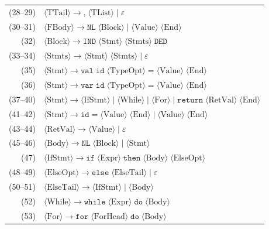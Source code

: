 \documentclass[11pt, a4paper]{article}
\begin{document}
\begin{tabular}{@{}r l@{}}
  (28--29)& $\langle\text{TTail}\rangle \to \texttt{,}\;\langle\text{TList}\rangle \mid \varepsilon$ \\
  (30--31)& $\langle\text{FBody}\rangle \to \texttt{NL}\;\langle\text{Block}\rangle \mid \langle\text{Value}\rangle\;\langle\text{End}\rangle$ \\
  (32)    & $\langle\text{Block}\rangle \to \texttt{IND}\;\langle\text{Stmt}\rangle\;\langle\text{Stmts}\rangle\;\texttt{DED}$ \\
  (33--34)& $\langle\text{Stmts}\rangle \to \langle\text{Stmt}\rangle\;\langle\text{Stmts}\rangle \mid \varepsilon$ \\
  (35)    & $\langle\text{Stmt}\rangle \to \texttt{val}\;\texttt{id}\;\langle\text{TypeOpt}\rangle\;\texttt{=}\;\langle\text{Value}\rangle\;\langle\text{End}\rangle$ \\
  (36)    & $\langle\text{Stmt}\rangle \to \texttt{var}\;\texttt{id}\;\langle\text{TypeOpt}\rangle\;\texttt{=}\;\langle\text{Value}\rangle\;\langle\text{End}\rangle$ \\
  (37--40)& $\langle\text{Stmt}\rangle \to \langle\text{IfStmt}\rangle \mid \langle\text{While}\rangle \mid \langle\text{For}\rangle \mid \texttt{return}\;\langle\text{RetVal}\rangle\;\langle\text{End}\rangle$ \\
  (41--42)& $\langle\text{Stmt}\rangle \to \texttt{id}\;\texttt{=}\;\langle\text{Value}\rangle\;\langle\text{End}\rangle \mid \langle\text{Value}\rangle\;\langle\text{End}\rangle$ \\
  (43--44)& $\langle\text{RetVal}\rangle \to \langle\text{Value}\rangle \mid \varepsilon$ \\
  (45--46)& $\langle\text{Body}\rangle \to \texttt{NL}\;\langle\text{Block}\rangle \mid \langle\text{Stmt}\rangle$ \\
  (47)    & $\langle\text{IfStmt}\rangle \to \texttt{if}\;\langle\text{Expr}\rangle\;\texttt{then}\;\langle\text{Body}\rangle\;\langle\text{ElseOpt}\rangle$ \\
  (48--49)& $\langle\text{ElseOpt}\rangle \to \texttt{else}\;\langle\text{ElseTail}\rangle \mid \varepsilon$ \\
  (50--51)& $\langle\text{ElseTail}\rangle \to \langle\text{IfStmt}\rangle \mid \langle\text{Body}\rangle$ \\
  (52)    & $\langle\text{While}\rangle \to \texttt{while}\;\langle\text{Expr}\rangle\;\texttt{do}\;\langle\text{Body}\rangle$ \\
  (53)    & $\langle\text{For}\rangle \to \texttt{for}\;\langle\text{ForHead}\rangle\;\texttt{do}\;\langle\text{Body}\rangle$ \\

\end{tabular}
\end{document}
